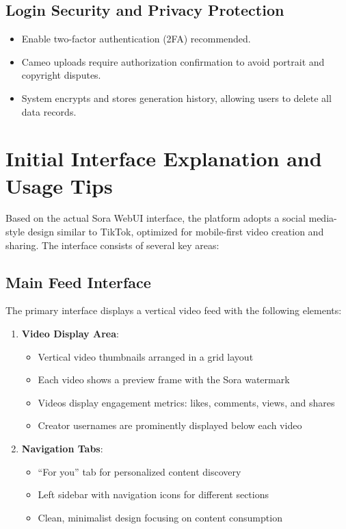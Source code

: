 \subsection{Login Security and Privacy Protection}

\begin{itemize}
\item Enable two-factor authentication (2FA) recommended.
\item Cameo uploads require authorization confirmation to avoid portrait and copyright disputes.
\item System encrypts and stores generation history, allowing users to delete all data records.
\end{itemize}

\section{Initial Interface Explanation and Usage Tips}

Based on the actual Sora WebUI interface, the platform adopts a social media-style design similar to TikTok, optimized for mobile-first video creation and sharing. The interface consists of several key areas:

\subsection{Main Feed Interface}

The primary interface displays a vertical video feed with the following elements:

\begin{enumerate}
\item \textbf{Video Display Area}:
\begin{itemize}
\item Vertical video thumbnails arranged in a grid layout
\item Each video shows a preview frame with the Sora watermark
\item Videos display engagement metrics: likes, comments, views, and shares
\item Creator usernames are prominently displayed below each video
\end{itemize}

\item \textbf{Navigation Tabs}:
\begin{itemize}
\item ``For you'' tab for personalized content discovery
\item Left sidebar with navigation icons for different sections
\item Clean, minimalist design focusing on content consumption
\end{itemize}
\end{enumerate}


